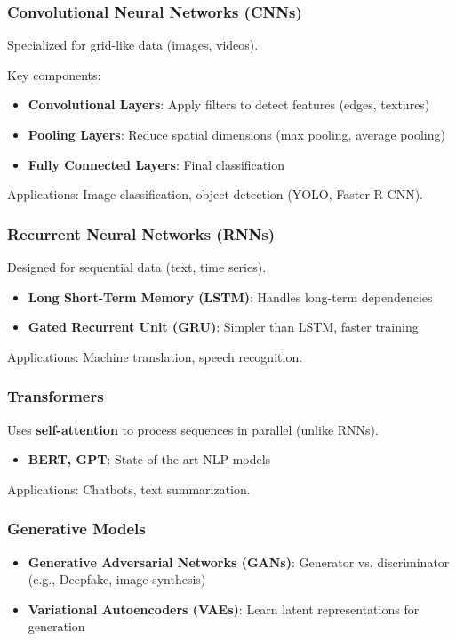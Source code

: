 \subsubsection{Convolutional Neural Networks (CNNs)}
Specialized for grid-like data (images, videos).

Key components:
\begin{itemize}
	\item \textbf{Convolutional Layers}: Apply filters to detect features (edges, textures)
	\item \textbf{Pooling Layers}: Reduce spatial dimensions (max pooling, average pooling)
	\item \textbf{Fully Connected Layers}: Final classification
\end{itemize}

Applications: Image classification, object detection (YOLO, Faster R-CNN).

\subsubsection{Recurrent Neural Networks (RNNs)}
Designed for sequential data (text, time series).
\begin{itemize}
	\item \textbf{Long Short-Term Memory (LSTM)}: Handles long-term dependencies
	\item \textbf{Gated Recurrent Unit (GRU)}: Simpler than LSTM, faster training
\end{itemize}

Applications: Machine translation, speech recognition.

\subsubsection{Transformers \cite{vaswani2017attention}}
Uses \textbf{self-attention} to process sequences in parallel (unlike RNNs).
\begin{itemize}
	\item \textbf{BERT, GPT}: State-of-the-art NLP models
\end{itemize}

Applications: Chatbots, text summarization.

\subsubsection{Generative Models}
\begin{itemize}
	\item \textbf{Generative Adversarial Networks (GANs)}: Generator vs. discriminator (e.g., Deepfake, image synthesis)
	\item \textbf{Variational Autoencoders (VAEs)}: Learn latent representations for generation
\end{itemize}



